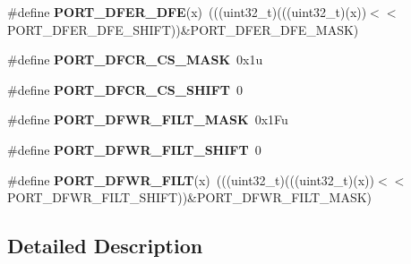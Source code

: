 \begin{DoxyCompactItemize}
\item 
\#define {\bfseries P\+O\+R\+T\+\_\+\+D\+F\+E\+R\+\_\+\+D\+FE}(x)~(((uint32\+\_\+t)(((uint32\+\_\+t)(x))$<$$<$P\+O\+R\+T\+\_\+\+D\+F\+E\+R\+\_\+\+D\+F\+E\+\_\+\+S\+H\+I\+FT))\&P\+O\+R\+T\+\_\+\+D\+F\+E\+R\+\_\+\+D\+F\+E\+\_\+\+M\+A\+SK)\hypertarget{group__PORT__Register__Masks_ga3261e250c50e71a33b4d443a6ca28c25}{}\label{group__PORT__Register__Masks_ga3261e250c50e71a33b4d443a6ca28c25}

\item 
\#define {\bfseries P\+O\+R\+T\+\_\+\+D\+F\+C\+R\+\_\+\+C\+S\+\_\+\+M\+A\+SK}~0x1u\hypertarget{group__PORT__Register__Masks_gadc66969dfb648b725cd30df406f7a2f9}{}\label{group__PORT__Register__Masks_gadc66969dfb648b725cd30df406f7a2f9}

\item 
\#define {\bfseries P\+O\+R\+T\+\_\+\+D\+F\+C\+R\+\_\+\+C\+S\+\_\+\+S\+H\+I\+FT}~0\hypertarget{group__PORT__Register__Masks_gac739bd97cc0b19198e8daa335c984500}{}\label{group__PORT__Register__Masks_gac739bd97cc0b19198e8daa335c984500}

\item 
\#define {\bfseries P\+O\+R\+T\+\_\+\+D\+F\+W\+R\+\_\+\+F\+I\+L\+T\+\_\+\+M\+A\+SK}~0x1\+Fu\hypertarget{group__PORT__Register__Masks_gaf2f0bbe1dea504156dce840fdcb94b74}{}\label{group__PORT__Register__Masks_gaf2f0bbe1dea504156dce840fdcb94b74}

\item 
\#define {\bfseries P\+O\+R\+T\+\_\+\+D\+F\+W\+R\+\_\+\+F\+I\+L\+T\+\_\+\+S\+H\+I\+FT}~0\hypertarget{group__PORT__Register__Masks_ga9045bd83bc548178d057bf4916c8fe08}{}\label{group__PORT__Register__Masks_ga9045bd83bc548178d057bf4916c8fe08}

\item 
\#define {\bfseries P\+O\+R\+T\+\_\+\+D\+F\+W\+R\+\_\+\+F\+I\+LT}(x)~(((uint32\+\_\+t)(((uint32\+\_\+t)(x))$<$$<$P\+O\+R\+T\+\_\+\+D\+F\+W\+R\+\_\+\+F\+I\+L\+T\+\_\+\+S\+H\+I\+FT))\&P\+O\+R\+T\+\_\+\+D\+F\+W\+R\+\_\+\+F\+I\+L\+T\+\_\+\+M\+A\+SK)\hypertarget{group__PORT__Register__Masks_gad79add2c6df026fd06198143aa198c99}{}\label{group__PORT__Register__Masks_gad79add2c6df026fd06198143aa198c99}

\end{DoxyCompactItemize}


\subsection{Detailed Description}
